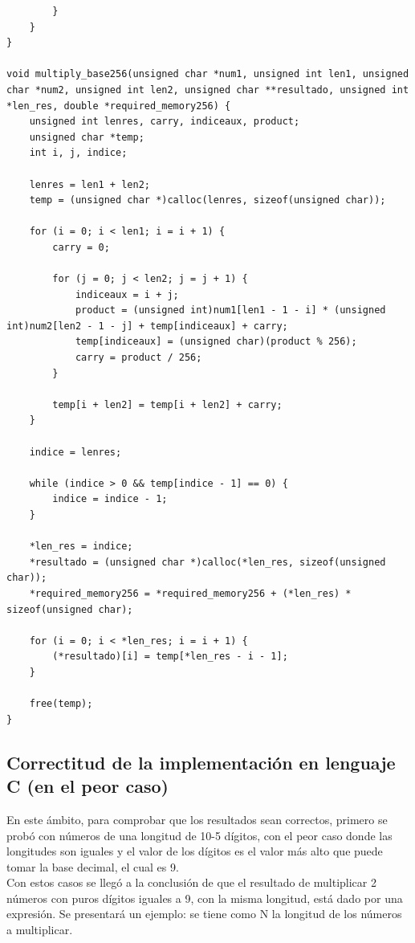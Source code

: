 \documentclass[10pt]{article}
\begin{document}
\begin{lstlisting}
        }
    }
}

void multiply_base256(unsigned char *num1, unsigned int len1, unsigned char *num2, unsigned int len2, unsigned char **resultado, unsigned int *len_res, double *required_memory256) {
    unsigned int lenres, carry, indiceaux, product;
    unsigned char *temp;
    int i, j, indice;

    lenres = len1 + len2;
    temp = (unsigned char *)calloc(lenres, sizeof(unsigned char));

    for (i = 0; i < len1; i = i + 1) {
        carry = 0;

        for (j = 0; j < len2; j = j + 1) {
            indiceaux = i + j;
            product = (unsigned int)num1[len1 - 1 - i] * (unsigned int)num2[len2 - 1 - j] + temp[indiceaux] + carry;
            temp[indiceaux] = (unsigned char)(product % 256);
            carry = product / 256;
        }

        temp[i + len2] = temp[i + len2] + carry;
    }

    indice = lenres;

    while (indice > 0 && temp[indice - 1] == 0) {
        indice = indice - 1;
    }

    *len_res = indice;
    *resultado = (unsigned char *)calloc(*len_res, sizeof(unsigned char));
    *required_memory256 = *required_memory256 + (*len_res) * sizeof(unsigned char);

    for (i = 0; i < *len_res; i = i + 1) {
        (*resultado)[i] = temp[*len_res - i - 1];
    }

    free(temp);
}
\end{lstlisting}

\subsection{Correctitud de la implementación en lenguaje C (en el peor caso)}

En este ámbito, para comprobar que los resultados sean correctos, primero se probó con números de una longitud de 10-5 dígitos, con el peor caso donde las longitudes son iguales y el valor de los dígitos es el valor más alto que puede tomar la base decimal, el cual es 9. \\
Con estos casos se llegó a la conclusión de que el resultado de multiplicar 2 números con puros dígitos iguales a 9, con la misma longitud, está dado por una expresión. Se presentará un ejemplo: se tiene como N la longitud de los números a multiplicar. \\
\end{document}
